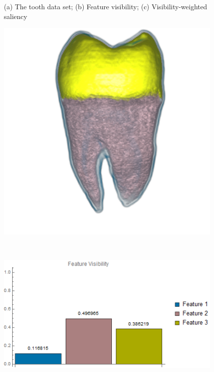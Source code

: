 \begin{figure}
\begin{minipage}{.24\textwidth}
		\subcaption{}
	\end{minipage}
	\caption{(a) The tooth data set; (b) Feature visibility; (c) Visibility-weighted saliency}
	\label{fig:tooth_naive_optimized_linesearch}
\end{figure}

\begin{figure}
	\centering
	\begin{minipage}{.24\textwidth}
		\includegraphics[width=1\linewidth]{images/tooth_naive_optimized_linesearch_red_low_saturation}
		\subcaption{}
	\end{minipage}~
	\begin{minipage}{.24\textwidth}
		\includegraphics[width=1\linewidth]{images/tooth_naive_optimized_linesearch_red_low_saturation_visibility_chart}

\end{minipage}
\end{figure}
